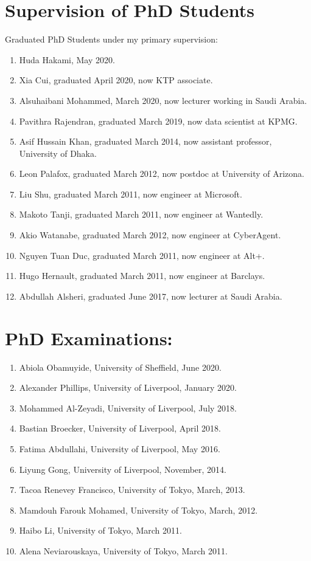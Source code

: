 \documentclass[a4paper,11pt]{article}
\begin{document}
\section{Supervision of PhD Students}
Graduated PhD Students under my primary supervision:
\begin{enumerate}
\item Huda Hakami, May 2020.
\item Xia Cui, graduated April 2020, now KTP associate.
\item Alsuhaibani Mohammed, March 2020, now lecturer working in Saudi Arabia.
\item Pavithra Rajendran, graduated March 2019, now data scientist at KPMG.
\item Asif Hussain Khan, graduated March 2014, now assistant professor, University of Dhaka.
\item Leon Palafox, graduated March 2012, now postdoc at University of Arizona.
\item Liu Shu, graduated March 2011, now engineer at Microsoft.
\item Makoto Tanji, graduated March 2011, now engineer at Wantedly.
\item Akio Watanabe, graduated March 2012, now engineer at CyberAgent.
\item Nguyen Tuan Duc, graduated March 2011, now engineer at Alt+.
\item Hugo Hernault, graduated March 2011, now engineer at Barclays.
\item  Abdullah Alsheri, graduated June 2017, now lecturer at Saudi Arabia.
\end{enumerate}

\section{PhD Examinations:}
\begin{enumerate}
\item Abiola Obamuyide, University of Sheffield, June 2020.
\item Alexander Phillips, University of Liverpool, January 2020.
\item Mohammed Al-Zeyadi, University of Liverpool, July 2018.
\item Bastian Broecker, University of Liverpool, April 2018.
\item Fatima Abdullahi, University of Liverpool, May 2016.
\item Liyung Gong, University of Liverpool, November, 2014.
\item Tacoa Renevey Francisco, University of Tokyo, March, 2013.
\item Mamdouh Farouk Mohamed, University of Tokyo, March, 2012.
\item Haibo Li, University of Tokyo, March 2011.
\item Alena Neviarouskaya, University of Tokyo, March 2011.
\end{enumerate}
\end{document}
